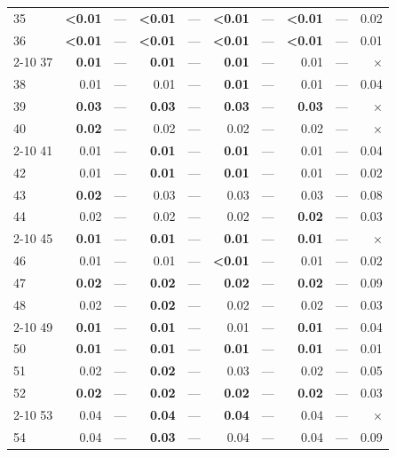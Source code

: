 \begin{longtable}{lr@{\hskip 4pt}l@{\hskip 12pt}r@{\hskip 4pt}l@{\hskip 12pt}r@{\hskip 4pt}l@{\hskip 12pt}r@{\hskip 4pt}l@{\hskip 12pt}r}
35 & \textbf{<0.01} & --- & \textbf{<0.01} & --- & \textbf{<0.01} & --- & \textbf{<0.01} & --- & 0.02 \\
36 & \textbf{<0.01} & --- & \textbf{<0.01} & --- & \textbf{<0.01} & --- & \textbf{<0.01} & --- & 0.01 \\
\cmidrule{2-10}
37 & \textbf{0.01} & --- & \textbf{0.01} & --- & \textbf{0.01} & --- & 0.01 & --- & $\times$ \\
38 & 0.01 & --- & 0.01 & --- & \textbf{0.01} & --- & 0.01 & --- & 0.04 \\
39 & \textbf{0.03} & --- & \textbf{0.03} & --- & \textbf{0.03} & --- & \textbf{0.03} & --- & $\times$ \\
40 & \textbf{0.02} & --- & 0.02 & --- & 0.02 & --- & 0.02 & --- & $\times$ \\
\cmidrule{2-10}
41 & 0.01 & --- & \textbf{0.01} & --- & \textbf{0.01} & --- & 0.01 & --- & 0.04 \\
42 & 0.01 & --- & \textbf{0.01} & --- & \textbf{0.01} & --- & 0.01 & --- & 0.02 \\
43 & \textbf{0.02} & --- & 0.03 & --- & 0.03 & --- & 0.03 & --- & 0.08 \\
44 & 0.02 & --- & 0.02 & --- & 0.02 & --- & \textbf{0.02} & --- & 0.03 \\
\cmidrule{2-10}
45 & \textbf{0.01} & --- & \textbf{0.01} & --- & \textbf{0.01} & --- & \textbf{0.01} & --- & $\times$ \\
46 & 0.01 & --- & 0.01 & --- & \textbf{<0.01} & --- & 0.01 & --- & 0.02 \\
47 & \textbf{0.02} & --- & \textbf{0.02} & --- & \textbf{0.02} & --- & \textbf{0.02} & --- & 0.09 \\
48 & 0.02 & --- & \textbf{0.02} & --- & 0.02 & --- & 0.02 & --- & 0.03 \\
\cmidrule{2-10}
49 & \textbf{0.01} & --- & \textbf{0.01} & --- & 0.01 & --- & \textbf{0.01} & --- & 0.04 \\
50 & \textbf{0.01} & --- & \textbf{0.01} & --- & \textbf{0.01} & --- & \textbf{0.01} & --- & 0.01 \\
51 & 0.02 & --- & \textbf{0.02} & --- & 0.03 & --- & 0.02 & --- & 0.05 \\
52 & \textbf{0.02} & --- & \textbf{0.02} & --- & \textbf{0.02} & --- & \textbf{0.02} & --- & 0.03 \\
\cmidrule{2-10}
53 & 0.04 & --- & \textbf{0.04} & --- & \textbf{0.04} & --- & 0.04 & --- & $\times$ \\
54 & 0.04 & --- & \textbf{0.03} & --- & 0.04 & --- & 0.04 & --- & 0.09 \\

\end{longtable}
